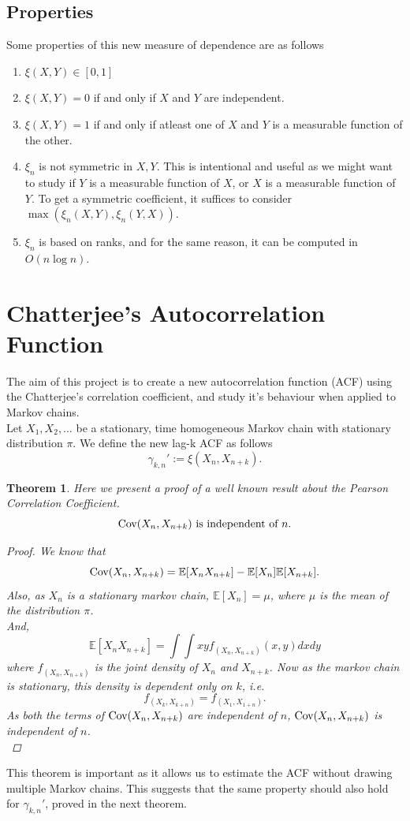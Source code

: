 \documentclass{article}
\newtheorem{theorem}{Theorem}[section]
\begin{document}
	\subsection{Properties}
	Some properties of this new measure of dependence are as follows
	\begin{enumerate}
		\item $\xi(X, Y) \in [0, 1]$
		\item $\xi(X, Y) = 0$ if and only if $X$ and $Y$ are independent.
		\item $\xi(X, Y) = 1$ if and only if atleast one of $X$ and $Y$ is a measurable function of the other.
		\item $\xi_n$ is not symmetric in $X, Y$. This is intentional and useful as we might want to study if $Y$ is a measurable function of $X$, or $X$ is a measurable function of $Y$. To get a symmetric coefficient, it suffices to consider $\max(\xi_n(X, Y), \xi_n(Y, X))$.
		\item $\xi_n$ is based on ranks, and for the same reason, it can be computed in $O(n\log n)$.
	\end{enumerate}

\section{Chatterjee's Autocorrelation Function}
	The aim of this project is to create a new autocorrelation function (ACF) using the Chatterjee's correlation coefficient, and study it's behaviour when applied to Markov chains.\\
	Let $X_1, X_2, \dots$ be a stationary, time homogeneous Markov chain with stationary distribution $\pi$.
	We define the new lag-k ACF as follows
	$$\gamma_{k, n}' := \xi(X_n, X_{n+k}).$$

	\begin{theorem}
		Here we present a proof of a well known result about the Pearson Correlation Coefficient.
		$$\text{Cov}(X_n, X_{n+k}) \text{ is independent of } n.$$
		\begin{proof}
			We know that
			$$\text{Cov}(X_n, X_{n+k}) = \mathbb{E}[X_n X_{n+k}] - \mathbb{E}[X_n]\mathbb{E}[X_{n+k}].$$
			Also, as $X_n$ is a stationary markov chain, $\mathbb{E}[X_n] = \mu$, where $\mu$ is the mean of the distribution $\pi$.\\
			And,
			$$\mathbb{E}[X_n X_{n+k}] = \int\int xyf_{(X_n, X_{n+k})}(x, y)dxdy$$
			where $f_{(X_n, X_{n+k})}$ is the joint density of $X_n$ and $X_{n+k}$. Now as the markov chain is stationary, this density is dependent only on $k$, i.e. $$f_{(X_k, X_{k+n})} = f_{(X_1, X_{1+n})}.$$
			As both the terms of $\text{Cov}(X_n, X_{n+k})$ are independent of $n$, $\text{Cov}(X_n, X_{n+k})$ is independent of $n$.\\
		\end{proof}
	\end{theorem}
	This theorem is important as it allows us to estimate the ACF without drawing multiple Markov chains.
	This suggests that the same property should also hold for $\gamma_{k, n}'$, proved in the next theorem.
\end{document}
